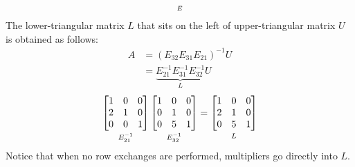 \documentclass[../main.tex]{subfiles}
\begin{document}
{\[{}_{\mathstrut E}
\]
The lower-triangular matrix $L$ that sits on the left of  upper-triangular matrix $U$ is obtained as follows:
\[
\begin{aligned}
A &= (E_{32}E_{31}E_{21})^{-1}U \\
  &= \underbrace{E_{21}^{-1}E_{31}^{-1}E_{32}^{-1}}_{L}U
\end{aligned}
\]
\[
\underbracket[0pt][0pt]{
\begin{bmatrix*}[r]
1 & 0 & 0 \\
2 & 1 & 0 \\
0 & 0 & 1
\end{bmatrix*}
}_{\mathstrut E_{21}^{-1}}
\underbracket[0pt][0pt]{
\begin{bmatrix*}[r]
1 & 0 & 0 \\
0 & 1 & 0 \\
0 & 5 & 1
\end{bmatrix*}
}_{\mathstrut E_{32}^{-1}}
=
\underbracket[0pt][0pt]{
\begin{bmatrix*}
1 & 0 & 0 \\
2 & 1 & 0 \\
0 & 5 & 1
\end{bmatrix*}
}_{\mathstrut L}
\]
Notice that when no row exchanges are performed, multipliers go directly into $L$.
}
\end{document}
